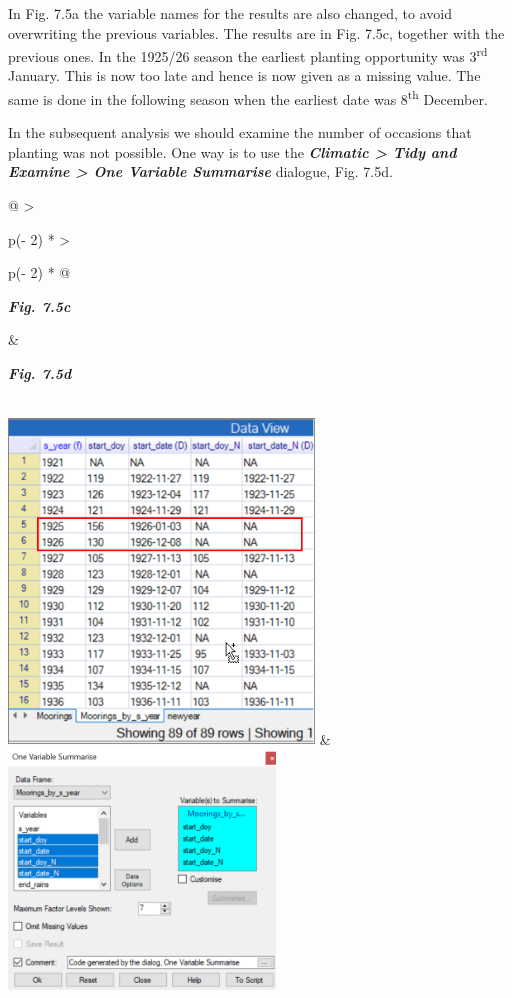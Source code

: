 \documentclass[
  letterpaper,
  DIV=11,
  numbers=noendperiod]{scrreprt}
\begin{document}
In Fig. 7.5a the variable names for the results are also changed, to
avoid overwriting the previous variables. The results are in Fig. 7.5c,
together with the previous ones. In the 1925/26 season the earliest
planting opportunity was 3\textsuperscript{rd} January. This is now too
late and hence is now given as a missing value. The same is done in the
following season when the earliest date was 8\textsuperscript{th}
December.

In the subsequent analysis we should examine the number of occasions
that planting was not possible. One way is to use the
\textbf{\emph{Climatic \textgreater{} Tidy and Examine \textgreater{}
One Variable Summarise}} dialogue, Fig. 7.5d.

\begin{longtable}[]{@{}
  >{\raggedright\arraybackslash}p{(\columnwidth - 2\tabcolsep) * }
  >{\raggedright\arraybackslash}p{(\columnwidth - 2\tabcolsep) * }@{}}
\toprule\noalign{}
\begin{minipage}[b]{\linewidth}\raggedright
\textbf{\emph{Fig. 7.5c}}
\end{minipage} & \begin{minipage}[b]{\linewidth}\raggedright
\textbf{\emph{Fig. 7.5d}}
\end{minipage} \\
\midrule\noalign{}
\endhead
\bottomrule\noalign{}
\endlastfoot
\includegraphics[width=3.20001in,height=3.4126in]{figures/Fig7.5c.png} &
\includegraphics[width=2.78995in,height=2.50823in]{figures/Fig7.5d.png} \\
\end{longtable}
\end{document}
